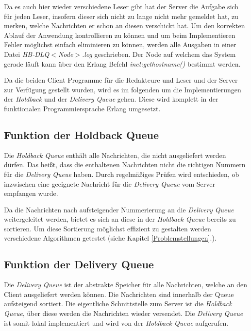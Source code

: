 Da es auch hier wieder verschiedene Leser gibt hat der Server die Aufgabe sich für jeden Leser, insofern dieser sich nicht zu lange nicht mehr gemeldet hat, zu merken, welche Nachrichten er schon an diesen verschickt hat. 
Um den korrekten Ablauf der Anwendung kontrollieren zu können und um beim Implementieren Fehler möglichst einfach eliminieren zu können, werden alle Ausgaben in einer Datei \textit{HB-DLQ$<$Node$>$.log} geschrieben. Der Node auf welchem das System gerade läuft kann über den Erlang Befehl \textit{inet:gethostname()} bestimmt werden.

Da die beiden Client Programme für die Redakteure und Leser und der Server zur Verfügung gestellt wurden, wird es im folgenden um die Implementierungen der \textit{Holdback} und der \textit{Delivery Queue} gehen. Diese wird komplett in der funktionalen Programmiersprache Erlang umgesetzt.

\subsection{Funktion der Holdback Queue}

Die \textit{Holdback Queue} enthält alle Nachrichten, die nicht ausgeliefert werden dürfen. Das heißt, dass die enthaltenen Nachrichten nicht die richtigen Nummern für die \textit{Delivery Queue} haben. Durch regelmäßiges Prüfen wird entschieden, ob inzwischen eine geeignete Nachricht für die \textit{Delivery Queue} vom Server empfangen wurde. 

Da die Nachrichten nach aufsteigender Nummerierung an die \textit{Delivery Queue} weitergeleitet werden, bietet es sich an diese in der \textit{Holdback Queue} bereits zu sortieren. 
Um diese Sortierung möglichst effizient zu gestalten werden verschiedene Algorithmen getestet (siehe Kapitel \ref{Problemstellungen}.).

\subsection{Funktion der Delivery Queue}

Die \textit{Delivery Queue} ist der abstrakte Speicher für alle Nachrichten, welche an den Client ausgeliefert werden können. Die Nachrichten sind innerhalb der Queue aufsteigend sortiert. Die eigentliche Schnittstelle zum Server ist die \textit{Holdback Queue}, über diese werden die Nachrichten wieder versendet. Die \textit{Delivery Queue} ist somit lokal implementiert und wird von der \textit{Holdback Queue} aufgerufen. 

